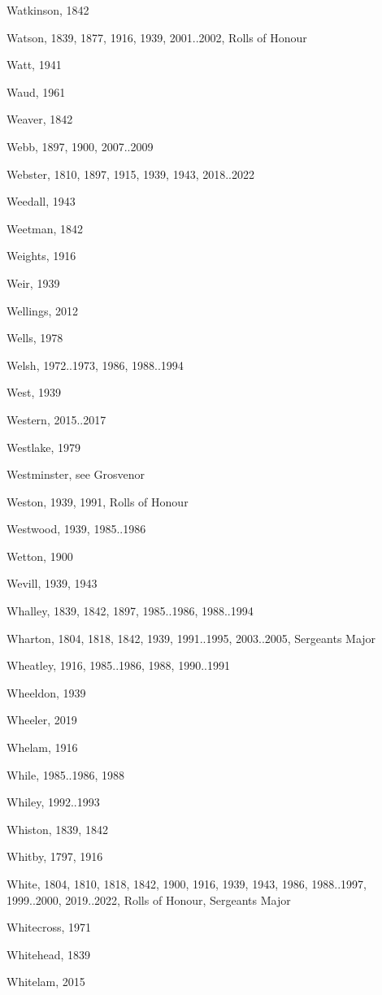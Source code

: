 {\begin{theindex}
\item Watkinson, 1842
\item Watson, 1839, 1877, 1916, 1939, 2001..2002, Rolls of Honour
\item Watt, 1941
\item Waud, 1961
\item Weaver, 1842
\item Webb, 1897, 1900, 2007..2009
\item Webster, 1810, 1897, 1915, 1939, 1943, 2018..2022
\item Weedall, 1943
\item Weetman, 1842
\item Weights, 1916
\item Weir, 1939
\item Wellings, 2012
\item Wells, 1978
\item Welsh, 1972..1973, 1986, 1988..1994
\item West, 1939
\item Western, 2015..2017
\item Westlake, 1979
\item Westminster, see Grosvenor
\item Weston, 1939, 1991, Rolls of Honour
\item Westwood, 1939, 1985..1986
\item Wetton, 1900
\item Wevill, 1939, 1943
\item Whalley, 1839, 1842, 1897, 1985..1986, 1988..1994
\item Wharton, 1804, 1818, 1842, 1939, 1991..1995, 2003..2005, Sergeants Major
\item Wheatley, 1916, 1985..1986, 1988, 1990..1991
\item Wheeldon, 1939
\item Wheeler, 2019
\item Whelam, 1916
\item While, 1985..1986, 1988
\item Whiley, 1992..1993
\item Whiston, 1839, 1842
\item Whitby, 1797, 1916
\item White, 1804, 1810, 1818, 1842, 1900, 1916, 1939, 1943, 1986, 1988..1997, 1999..2000, 2019..2022, Rolls of Honour, Sergeants Major
\item Whitecross, 1971
\item Whitehead, 1839
\item Whitelam, 2015

\end{theindex}}
